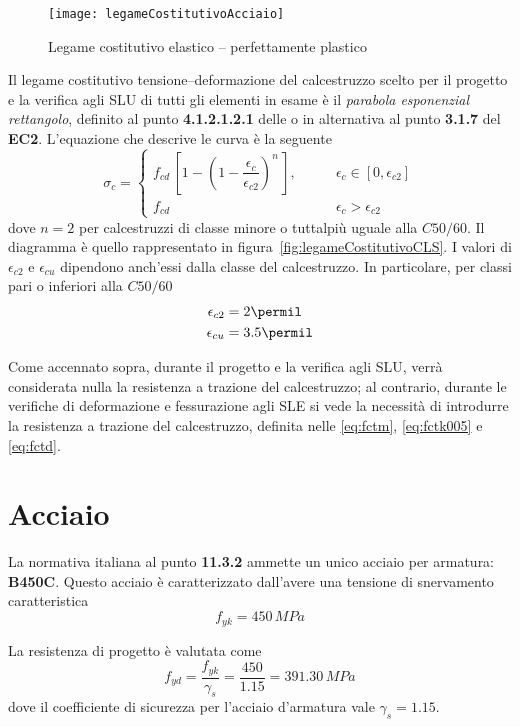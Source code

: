 \begin{figure}
	\centering
	\texttt{[image: legameCostitutivoAcciaio]}
	\caption{Legame costitutivo elastico -- perfettamente plastico}
	\label{fig:legameCostitutivoAcciaio}
\end{figure}

Il legame costitutivo tensione--deformazione del calcestruzzo scelto per il progetto e la verifica agli SLU di tutti gli elementi in esame \`e il \emph{parabola esponenzial rettangolo}, definito al punto \textbf{4.1.2.1.2.1} delle \ntc o in alternativa al punto \textbf{3.1.7} del \textbf{EC2}. L'equazione che descrive le curva \`e la seguente
\begin{equation}
	\sigma_c = \begin{cases}
		f_{cd}\,\left[1-\left(1-\dfrac{\epsilon_c}{\epsilon_{c2}}\right)^n\,\right],\qquad &\epsilon_c \in [0, \epsilon_{c2}]\\
		f_{cd} &\epsilon_c > \epsilon_{c2}
	           \end{cases}
	\label{eq:legameCostitutivoCLS}
\end{equation}
dove $n=2$ per calcestruzzi di classe minore o tuttalpi\`u uguale alla $C50/60$. Il diagramma \`e quello rappresentato in figura~\ref{fig:legameCostitutivoCLS}. I valori di $\epsilon_{c2}$ e $\epsilon_{cu}$ dipendono anch'essi dalla classe del calcestruzzo. In particolare, per classi pari o inferiori alla $C50/60$
\begin{align*}
	\epsilon_{c2} &= 2\permil\\
	\epsilon_{cu} &= 3.5\permil
\end{align*}

Come accennato sopra, durante il progetto e la verifica agli SLU, verr\`a considerata nulla la resistenza a trazione del calcestruzzo; al contrario, durante le verifiche di deformazione e fessurazione agli SLE si vede la necessit\`a di introdurre la resistenza a trazione del calcestruzzo, definita nelle \eqref{eq:fctm}, \eqref{eq:fctk005} e \eqref{eq:fctd}.

\section{Acciaio}
La normativa italiana al punto \textbf{11.3.2} ammette un unico acciaio per armatura: \textbf{B450C}. Questo acciaio \`e caratterizzato dall'avere una tensione di snervamento caratteristica 
\[
f_{yk} = 450\,MPa
\]

La resistenza di progetto \`e valutata come
\begin{equation}
    \label{eq:fyd}
	f_{yd} = \dfrac{f_{yk}}{\gamma_s} = \dfrac{450}{1.15} = 391.30\,MPa
\end{equation}
dove il coefficiente di sicurezza per l'acciaio d'armatura vale $\gamma_s = 1.15$.

